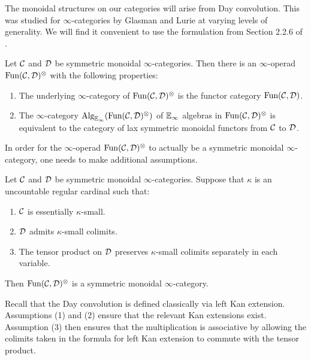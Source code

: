 The monoidal structures on our categories will arise from Day convolution.  This was studied for $\infty$-categories by Glasman \cite{**INSERT CITATION**} and Lurie \cite{LurieRot, HA} at varying levels of generality.  We will find it convenient to use the formulation from Section 2.2.6 of \cite{HA}.  

\begin{thm}
Let $\operatorname{\mathcal{C}}$ and $\operatorname{\mathcal{D}}$ be symmetric monoidal $\infty$-categories.  Then there is an $\infty$-operad $\operatorname{\text{Fun}}(\operatorname{\mathcal{C}}, \operatorname{\mathcal{D}})^{\otimes} $ with the following properties:
\begin{enumerate}
\item The underlying $\infty$-category of $\operatorname{\text{Fun}}(\operatorname{\mathcal{C}},\operatorname{\mathcal{D}})^{\otimes}$ is the functor category $\operatorname{\text{Fun}}(\operatorname{\mathcal{C}}, \operatorname{\mathcal{D}})$.
\item The $\infty$-category $\operatorname{\text{Alg}}_{\operatorname{\mathbb{E}}_\infty}(\operatorname{\text{Fun}}(\operatorname{\mathcal{C}}, \operatorname{\mathcal{D}})^{\otimes})$ of $\operatorname{\mathbb{E}}_\infty$ algebras in $\operatorname{\text{Fun}}(\operatorname{\mathcal{C}},\operatorname{\mathcal{D}})^{\otimes}$ is equivalent to the category of lax symmetric monoidal functors from $\operatorname{\mathcal{C}}$ to $\operatorname{\mathcal{D}}$.  

\end{enumerate}
\end{thm}

In order for the $\infty$-operad $\operatorname{\text{Fun}}(\operatorname{\mathcal{C}},\operatorname{\mathcal{D}})^{\otimes}$ to actually be a symmetric monoidal $\infty$-category, one needs to make additional assumptions.  

\begin{prop}\label{prop:dayconvsmc}
Let $\operatorname{\mathcal{C}}$ and $\operatorname{\mathcal{D}}$ be symmetric monoidal $\infty$-categories.  Suppose that $\kappa$ is an uncountable regular cardinal such that:
\begin{enumerate}
\item $\operatorname{\mathcal{C}}$ is essentially $\kappa$-small.
\item $\operatorname{\mathcal{D}}$ admits $\kappa$-small colimits.
\item The tensor product on $\operatorname{\mathcal{D}}$ preserves $\kappa$-small colimits separately in each variable.  
\end{enumerate}
Then $\operatorname{\text{Fun}}(\operatorname{\mathcal{C}},\operatorname{\mathcal{D}})^{\otimes}$ is a symmetric monoidal $\infty$-category.  
\end{prop}

Recall that the Day convolution is defined classically via left Kan extension.  Assumptions (1) and (2) ensure that the relevant Kan extensions exist.  Assumption (3) then ensures that the multiplication is associative by allowing the colimits taken in the formula for left Kan extension to commute with the tensor product.  

